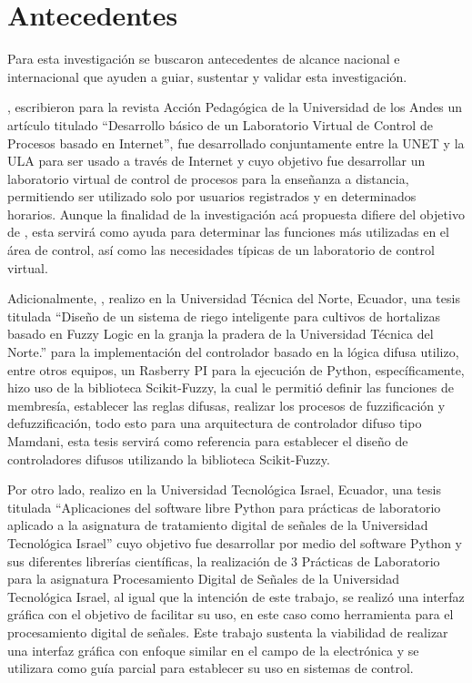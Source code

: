 \section{Antecedentes}
	
	Para esta investigación se buscaron antecedentes de alcance nacional e internacional que ayuden a guiar, sustentar y validar esta investigación.
	
	\textcite{casallas2005desarrollo}, escribieron para la revista Acción Pedagógica de la Universidad de los Andes un artículo titulado \enquote{Desarrollo básico de un Laboratorio Virtual de Control de Procesos basado en Internet}, fue desarrollado conjuntamente entre la UNET y la ULA para ser usado a través de Internet y cuyo objetivo fue desarrollar un laboratorio virtual de control de procesos para la enseñanza a distancia, permitiendo ser utilizado solo por usuarios registrados y en determinados horarios. Aunque la finalidad de la investigación acá propuesta difiere del objetivo de \citeauthor{casallas2005desarrollo}, esta servirá como ayuda para determinar las funciones más utilizadas en el área de control, así como las necesidades típicas de un laboratorio de control virtual.
	
	Adicionalmente, \textcite{salazar2019diseno}, realizo en la Universidad Técnica del Norte, Ecuador, una tesis titulada \enquote{Diseño de un sistema de riego inteligente para cultivos de hortalizas basado en Fuzzy Logic en la granja la pradera de la Universidad Técnica del Norte.} para la implementación del controlador basado en la lógica difusa utilizo, entre otros equipos, un Rasberry PI para la ejecución de Python, específicamente, hizo uso de la biblioteca Scikit-Fuzzy, la cual le permitió definir las funciones de membresía, establecer las reglas difusas, realizar los procesos de fuzzificación y defuzzificación, todo esto para una arquitectura de controlador difuso tipo Mamdani, esta tesis servirá como referencia para establecer el diseño de controladores difusos utilizando la biblioteca Scikit-Fuzzy.

	Por otro lado, \textcite{congo2018aplicaciones} realizo en la Universidad Tecnológica Israel, Ecuador, una tesis titulada \enquote{Aplicaciones del software libre Python para prácticas de laboratorio aplicado a la asignatura de tratamiento digital de señales de la Universidad Tecnológica Israel} cuyo objetivo fue desarrollar por medio del software Python y sus diferentes librerías científicas, la realización de 3 Prácticas de Laboratorio para la asignatura Procesamiento Digital de Señales de la Universidad Tecnológica Israel, al igual que la intención de este trabajo, se realizó una interfaz gráfica con el objetivo de facilitar su uso, en este caso como herramienta para el procesamiento digital de señales. Este trabajo sustenta la viabilidad de realizar una interfaz gráfica con enfoque similar en el campo de la electrónica y se utilizara como guía parcial para establecer su uso en sistemas de control.
	
